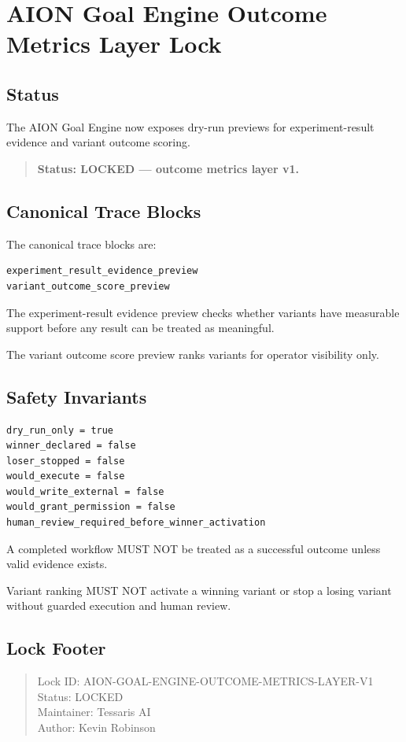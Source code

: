 \section{AION Goal Engine Outcome Metrics Layer Lock}
\label{sec:aion-goal-engine-outcome-metrics-layer-lock}

\subsection{Status}

The AION Goal Engine now exposes dry-run previews for experiment-result evidence and variant outcome scoring.

\begin{quote}
\textbf{Status: LOCKED --- outcome metrics layer v1.}
\end{quote}

\subsection{Canonical Trace Blocks}

The canonical trace blocks are:

\begin{verbatim}
experiment_result_evidence_preview
variant_outcome_score_preview
\end{verbatim}

The experiment-result evidence preview checks whether variants have measurable support before any result can be treated as meaningful.

The variant outcome score preview ranks variants for operator visibility only.

\subsection{Safety Invariants}

\begin{verbatim}
dry_run_only = true
winner_declared = false
loser_stopped = false
would_execute = false
would_write_external = false
would_grant_permission = false
human_review_required_before_winner_activation
\end{verbatim}

A completed workflow MUST NOT be treated as a successful outcome unless valid evidence exists.

Variant ranking MUST NOT activate a winning variant or stop a losing variant without guarded execution and human review.

\subsection{Lock Footer}

\begin{quote}
Lock ID: AION-GOAL-ENGINE-OUTCOME-METRICS-LAYER-V1\\
Status: LOCKED\\
Maintainer: Tessaris AI\\
Author: Kevin Robinson
\end{quote}
